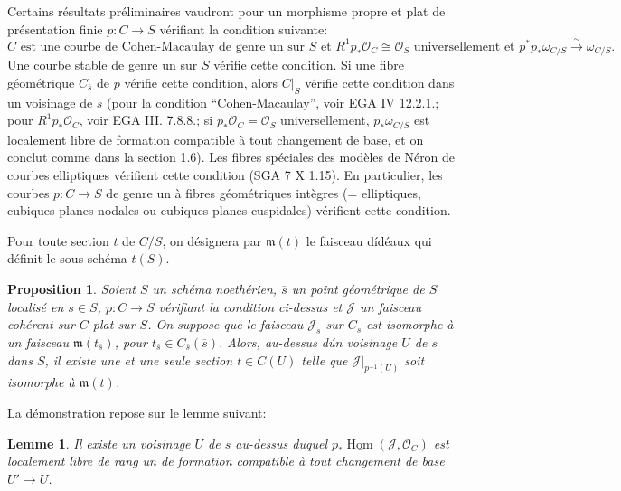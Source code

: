 \documentclass{amsart}
\theoremstyle{plain}
\newtheorem{proposition}[theorem]{Proposition}
\newtheorem{lemma}[theorem]{Lemme}
\theoremstyle{remark}
\DeclareMathOperator{\Hom}{Hom}
\newcommand{\cO}{\mathcal{O}}
\begin{document}
\subsubsection{}
Certains r\'esultats pr\'eliminaires vaudront pour un morphisme propre et plat de
pr\'esentation finie $p: C \to S$ v\'erifiant la condition suivante:
\begin{equation}
\text{$C$ est une courbe de Cohen-Macaulay de genre un sur $S$ et } R^1 p_* \cO_C \cong \cO_S
\text{ universellement et } p^* p_* \omega_{C/S} \xrightarrow{\sim} \omega_{C/S}.
\end{equation}
Une courbe stable de genre un sur $S$ v\'erifie cette condition. Si une fibre
g\'eom\'etrique $C_{\overline{s}}$ de $p$ v\'erifie cette condition, alors $C|_S$ v\'erifie
cette condition dans un voisinage de $s$ (pour la condition ``Cohen-Macaulay'', voir
EGA IV 12.2.1.; pour $R^1 p_* \cO_C$, voir EGA III. 7.8.8.; si
$p_* \cO_C = \cO_S$ universellement, $p_* \omega_{C/S}$ est localement libre de
formation compatible \`a tout changement de base, et on conclut comme dans la section 1.6).
Les fibres sp\'eciales des mod\`eles de N\'eron de courbes elliptiques v\'erifient cette
condition (SGA 7 X 1.15). En particulier, les courbes $p: C \to S$ de genre un \`a
fibres g\'eom\'etriques int\`egres (= elliptiques, cubiques planes nodales ou cubiques
planes cuspidales) v\'erifient cette condition.

Pour toute section $t$ de $C/S$, on d\'esignera par $\mathfrak{m}(t)$ le faisceau d\'id\'eaux
qui d\'efinit le sous-sch\'ema $t(S)$.

\begin{proposition}
Soient $S$ un sch\'ema noeth\'erien, $\overline{s}$ un point g\'eom\'etrique de $S$
localis\'e en $s \in S$, $p: C \to S$ v\'erifiant la condition ci-dessus et $\mathcal{J}$
un faisceau coh\'erent sur $C$ plat sur $S$. On suppose que le faisceau $\mathcal{J}_s$
sur $C_{\overline{s}}$ est isomorphe \`a un faisceau $\mathfrak{m}(t_{\overline{s}})$, pour
$t_{\overline{s}} \in C_{\overline{s}}(\overline{s})$. Alors, au-dessus d\'un voisinage $U$ de
$s$ dans $S$, il existe une et une seule section $t \in C(U)$ telle que
$\mathcal{J}|_{p^{-1}(U)}$ soit isomorphe \`a $\mathfrak{m}(t)$.
\end{proposition}

La d\'emonstration repose sur le lemme suivant:

\begin{lemma}
Il existe un voisinage $U$ de $s$ au-dessus duquel
$p_* \underline{\Hom}(\mathcal{J}, \cO_C)$ est localement libre de rang un de formation
compatible \`a tout changement de base $U' \to U$.
\end{lemma}
\end{document}
